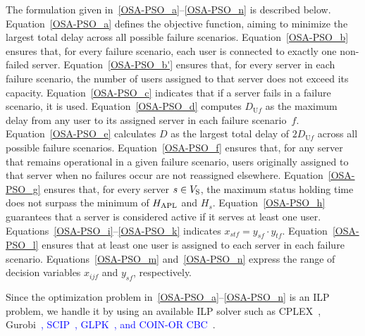 \documentclass[10pt, letterpaper]{IEEEtran}
\newcommand\blue[1]{\textcolor{blue}{#1}}
\newcommand\magenta[1]{\textcolor{magenta}{#1}}
\begin{document}
\begin{CJK}{UTF8}{ipxm}
The formulation given in~\eqref{OSA-PSO_a}--\eqref{OSA-PSO_n} is described below.
Equation~\eqref{OSA-PSO_a} defines the objective function, aiming to minimize the largest total delay across all possible failure scenarios.
Equation~\eqref{OSA-PSO_b} ensures that, for every failure scenario, each user is connected to exactly one non-failed server.
Equation~\eqref{OSA-PSO_b'} ensures that, for every server in each failure scenario, the number of users assigned to that server does not exceed its capacity.
Equation~\eqref{OSA-PSO_c} indicates that if a server fails in a failure scenario, it is used.
%
Equation~\eqref{OSA-PSO_d} computes $D_{\mathrm{U}f}$ as the maximum delay from any user to its assigned server in each failure scenario~$f$. %
Equation~\eqref{OSA-PSO_e} calculates $D$ as the largest total delay of $2D_{\mathrm{U}f}$ across all possible failure scenarios.
Equation~\eqref{OSA-PSO_f} ensures that, for any server that remains operational in a given failure scenario, users originally assigned to that server when no failures occur are not reassigned elsewhere.
Equation~\eqref{OSA-PSO_g} ensures that, for every server $s \in V_{\rm{S}}$, the maximum status holding time does not surpass the minimum of $H_{\rm APL}$ and $H_s$.
Equation~\eqref{OSA-PSO_h} guarantees that a server is considered active if it serves at least one user.
Equations~\eqref{OSA-PSO_i}--\eqref{OSA-PSO_k} indicates $x_{stf} = y_{sf} \cdot y_{tf}$.
Equation~\eqref{OSA-PSO_l} ensures that at least one user is assigned to each server in each failure scenario. Equations~\eqref{OSA-PSO_m} and~\eqref{OSA-PSO_n} express the range of decision variables $x_{ijf}$ and $y_{sf}$, respectively.

Since the optimization problem in~\eqref{OSA-PSO_a}--\eqref{OSA-PSO_n} is an ILP problem, we handle it by using an available ILP solver such as CPLEX~\cite{CPLEX}, Gurobi~\cite{Gurobi}\blue{, SCIP~\cite{SCIP}, GLPK~\cite{GLPK}, and COIN-OR CBC~\cite{CBC}}.


\end{CJK}
\end{document}
